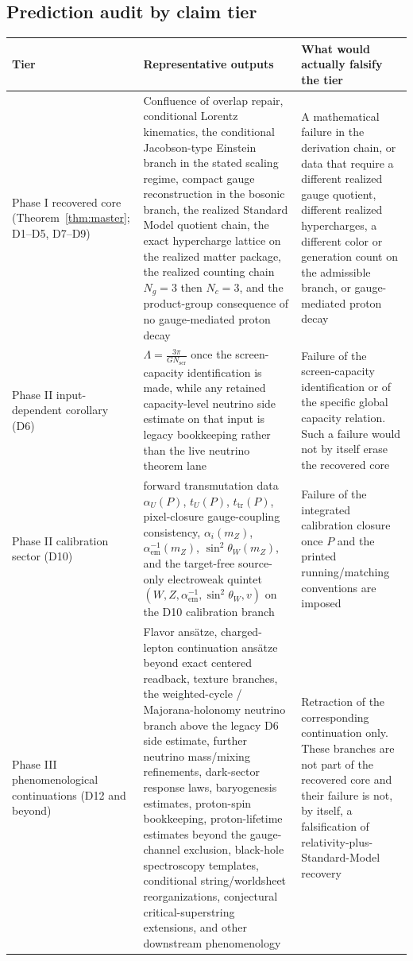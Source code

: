\documentclass[11pt]{article}
\begin{document}
\subsection{Prediction audit by claim tier}

\begingroup
\footnotesize
\begin{longtable}{@{}>{\raggedright\arraybackslash}p{}>{\raggedright\arraybackslash}p{}>{\raggedright\arraybackslash}p{}@{}}
\toprule
Tier & Representative outputs & What would actually falsify the tier \\
\midrule
\endhead
\bottomrule
\endfoot
Phase I recovered core (Theorem~\ref{thm:master}; D1--D5, D7--D9) & Confluence of overlap repair, conditional Lorentz kinematics, the conditional Jacobson-type Einstein branch in the stated scaling regime, compact gauge reconstruction in the bosonic branch, the realized Standard Model quotient chain, the exact hypercharge lattice on the realized matter package, the realized counting chain \(N_g=3\) then \(N_c=3\), and the product-group consequence of no gauge-mediated proton decay & A mathematical failure in the derivation chain, or data that require a different realized gauge quotient, different realized hypercharges, a different color or generation count on the admissible branch, or gauge-mediated proton decay \\
Phase II input-dependent corollary (D6) & \(\Lambda=\frac{3\pi}{G N_{\mathrm{scr}}}\) once the screen-capacity identification is made, while any retained capacity-level neutrino side estimate on that input is legacy bookkeeping rather than the live neutrino theorem lane & Failure of the screen-capacity identification or of the specific global capacity relation. Such a failure would not by itself erase the recovered core \\
Phase II calibration sector (D10) & forward transmutation data \(\alpha_U(P)\), \(t_U(P)\), \(t_{\mathrm{tr}}(P)\), pixel-closure gauge-coupling consistency, \(\alpha_i(m_Z)\), \(\alpha_{\mathrm{em}}^{-1}(m_Z)\), \(\sin^2\theta_W(m_Z)\), and the target-free source-only electroweak quintet \((W,Z,\alpha_{\mathrm{em}}^{-1},\sin^2\theta_W,v)\) on the D10 calibration branch & Failure of the integrated calibration closure once \(P\) and the printed running/matching conventions are imposed \\
Phase III phenomenological continuations (D12 and beyond) & Flavor ans\"atze, charged-lepton continuation ans\"atze beyond exact centered readback, texture branches, the weighted-cycle / Majorana-holonomy neutrino branch above the legacy D6 side estimate, further neutrino mass/mixing refinements, dark-sector response laws, baryogenesis estimates, proton-spin bookkeeping, proton-lifetime estimates beyond the gauge-channel exclusion, black-hole spectroscopy templates, conditional string/worldsheet reorganizations, conjectural critical-superstring extensions, and other downstream phenomenology & Retraction of the corresponding continuation only. These branches are not part of the recovered core and their failure is not, by itself, a falsification of relativity-plus-Standard-Model recovery \\
\end{longtable}
\endgroup
\end{document}

